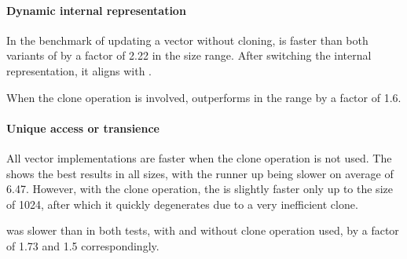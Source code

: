 
\paragraph{Dynamic internal representation}
In the benchmark of updating a vector without cloning, \pvec{} is faster than both variants of \rrbvec{} by a factor of 2.22 in the \range{[10, 1024]} size range. After switching the internal representation, it aligns with \rrbvec{}. 

When the clone operation is involved, \pvec{} outperforms \rrbvec{} in the \range{[80, 1024]} range by a factor of 1.6. 

\paragraph{Unique access or transience}
All vector implementations are faster when the clone operation is not used. The \stdvec{} shows the best results in all sizes, with the runner up \pvec{} being slower on average of 6.47. However, with the clone operation, the \stdvec{} is slightly faster only up to the size of 1024, after which it quickly degenerates due to a very inefficient clone. 

\imrsvec{} was slower than \rrbvec{} in both tests, with and without clone operation used, by a factor of 1.73 and 1.5 correspondingly. 

